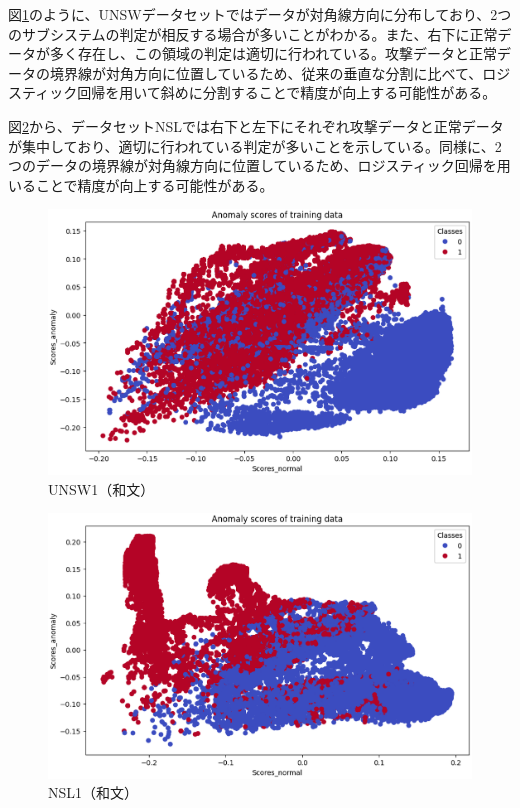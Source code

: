 \documentclass{css}
\begin{document}
図\ref{fig:UNSW1}のように、UNSWデータセットではデータが対角線方向に分布しており、2つのサブシステムの判定が相反する場合が多いことがわかる。また、右下に正常データが多く存在し、この領域の判定は適切に行われている。攻撃データと正常データの境界線が対角方向に位置しているため、従来の垂直な分割に比べて、ロジスティック回帰を用いて斜めに分割することで精度が向上する可能性がある。

図\ref{fig:NSL1}から、データセットNSLでは右下と左下にそれぞれ攻撃データと正常データが集中しており、適切に行われている判定が多いことを示している。同様に、2つのデータの境界線が対角線方向に位置しているため、ロジスティック回帰を用いることで精度が向上する可能性がある。

\begin{figure}[tb]
    \centering
    \includegraphics[width=\linewidth]{pictures/eps/UNSW1.eps}
    \caption{UNSW1（和文）}
    \label{fig:UNSW1}
\end{figure}

\begin{figure}[tb]
    \centering
    \includegraphics[width=\linewidth]{pictures/eps/NSL1.eps}
    \caption{NSL1（和文）}
    \label{fig:NSL1}
\end{figure}
\end{document}
